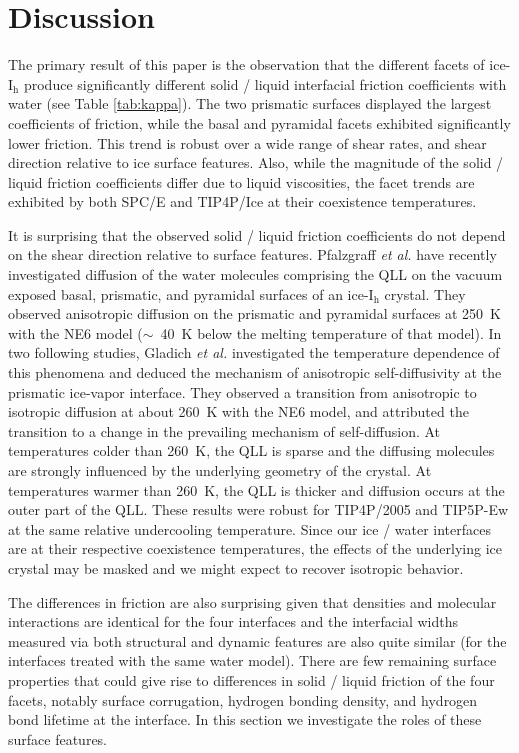  
\section{Discussion}
The primary result of this paper is the observation that the different
facets of ice-I$_\mathrm{h}$ produce significantly different solid /
liquid interfacial friction coefficients with water (see Table
\ref{tab:kappa}).  The two prismatic surfaces displayed the largest
coefficients of friction, while the basal and pyramidal facets
exhibited significantly lower friction. This trend is robust over a
wide range of shear rates, and shear direction relative to ice surface
features. Also, while the magnitude of the solid / liquid friction
coefficients differ due to liquid viscosities, the facet trends are
exhibited by both SPC/E and TIP4P/Ice at their coexistence
temperatures.

It is surprising that the observed solid / liquid friction
coefficients do not depend on the shear direction relative to surface
features. Pfalzgraff \textit{et al.} have recently investigated
diffusion of the water molecules comprising the QLL on the vacuum
exposed basal, prismatic, and pyramidal surfaces of an
ice-I$_\mathrm{h}$ crystal.\cite{Pfalzgraff2011} They observed
anisotropic diffusion on the prismatic and pyramidal surfaces at 250~K
with the NE6 model ($\sim$~40~K below the melting temperature of that
model). In two following studies, Gladich \textit{et al.}
investigated the temperature dependence of this phenomena and deduced
the mechanism of anisotropic self-diffusivity at the prismatic
ice-vapor interface.\cite{Gladich2011,Gladich2015} They observed a
transition from anisotropic to isotropic diffusion at about 260~K with
the NE6 model, and attributed the transition to a change in the
prevailing mechanism of self-diffusion. At temperatures colder than
260~K, the QLL is sparse and the diffusing molecules are strongly
influenced by the underlying geometry of the crystal. At temperatures
warmer than 260~K, the QLL is thicker and diffusion occurs at the
outer part of the QLL. These results were robust for TIP4P/2005 and
TIP5P-Ew at the same relative undercooling temperature. Since our ice
/ water interfaces are at their respective coexistence temperatures,
the effects of the underlying ice crystal may be masked and we might
expect to recover isotropic behavior.

The differences in friction are also surprising given that densities
and molecular interactions are identical for the four interfaces and
the interfacial widths measured via both structural and dynamic
features are also quite similar (for the interfaces treated with the
same water model). There are few remaining surface properties that
could give rise to differences in solid / liquid friction of the four
facets, notably surface corrugation, hydrogen bonding density, and
hydrogen bond lifetime at the interface. In this section we
investigate the roles of these surface features.

